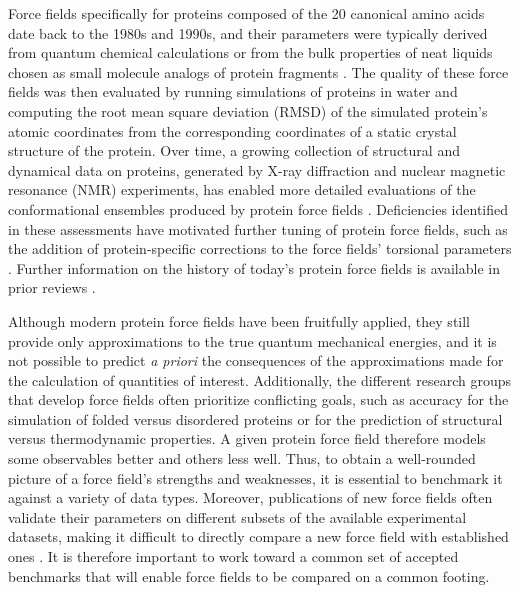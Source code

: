\documentclass[9pt,review,pubversion]{livecoms}
\begin{document}
Force fields specifically for proteins composed of the 20 canonical amino acids date back to the 1980s and 1990s, and their parameters were typically derived from quantum chemical calculations or from the bulk properties of neat liquids chosen as small molecule analogs of protein fragments \cite{jorgensen_opls_1988,cornell_second_1995,mackerell_all-atom_1998}.
The quality of these force fields was then evaluated by running simulations of proteins in water and computing the root mean square deviation (RMSD) of the simulated protein’s atomic coordinates from the corresponding coordinates of a static crystal structure of the protein.
Over time, a growing collection of structural and dynamical data on proteins, generated by X-ray diffraction and nuclear magnetic resonance (NMR) experiments, has enabled more detailed evaluations of the conformational ensembles produced by protein force fields \cite{smith_comparison_1995,van_der_spoel_molecular_1996,van_der_spoel_solution_1998,stocker_molecular_2000,van_der_spoel_brute-force_2003,oostenbrink_validation_2005}.
Deficiencies identified in these assessments have motivated further tuning of protein force fields, such as the addition of protein-specific corrections to the force fields’ torsional parameters \cite{lindorff-larsen_improved_2010,best_optimization_2012,mackerell_jr_extending_2004,hornak_comparison_2006,maier_ff14sb_2015,diem_hamiltonian_2020,tian_ff19sb_2020}.
Further information on the history of today’s protein force fields is available in prior reviews \cite{lifson_recent_1973,ponder_force_2003,guvench_comparison_2008,zhu_recent_2012,dauber-osguthorpe_biomolecular_2019}.

Although modern protein force fields have been fruitfully applied, they still provide only approximations to the true quantum mechanical energies, and it is not possible to predict {\em a priori} the consequences of the approximations made for the calculation of quantities of interest. 
Additionally, the different research groups that develop force fields often prioritize conflicting goals, such as accuracy for the simulation of folded versus disordered proteins or for the prediction of structural versus thermodynamic properties.
A given protein force field therefore models some observables better and others less well.
Thus, to obtain a well-rounded picture of a force field’s strengths and weaknesses, it is essential to benchmark it against a variety of data types.
Moreover, publications of new force fields often validate their parameters on different subsets of the available experimental datasets, making it difficult to directly compare a new force field with established ones \cite{hagler_force_2019}.
It is therefore important to work toward a common set of accepted benchmarks that will enable force fields to be compared on a common footing.
\end{document}
